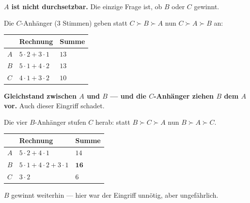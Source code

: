 \begin{aufgabe}
\begin{center}
\begin{minipage}{0.9\textwidth}
\textbf{$A$ ist nicht durchsetzbar.} Die einzige Frage ist, ob $B$ oder $C$ gewinnt.
\end{minipage}
\end{center}


Die $C$-Anhänger ($3$ Stimmen) geben statt $C\succ B\succ A$ nun $C\succ A\succ B$ an:
\begin{center}
{\small
\renewcommand{\arraystretch}{1.48}
\begin{tabular}{@{}P{1.6cm}P{3.2cm}P{1.6cm}@{}}
\toprule
& \textbf{Rechnung} & \textbf{Summe}\\
\midrule
$A$ & $5\cdot2+3\cdot1$ & $13$\\
$B$ & $5\cdot1+4\cdot2$ & $13$\\
$C$ & $4\cdot1+3\cdot2$ & $10$\\
\bottomrule
\end{tabular}}
\end{center}

\begin{center}
\begin{minipage}{0.9\textwidth}
\textbf{Gleichstand zwischen $A$ und $B$ --- und die $C$-Anhänger ziehen $B$ dem $A$ vor.} Auch dieser Eingriff schadet.
\end{minipage}
\end{center}

Die vier $B$-Anhänger stufen $C$ herab: statt $B\succ C\succ A$ nun $B\succ A\succ C$.
\begin{center}
{\small
\renewcommand{\arraystretch}{1.48}
\begin{tabular}{@{}P{1.6cm}P{3.2cm}P{1.6cm}@{}}
\toprule
& \textbf{Rechnung} & \textbf{Summe}\\
\midrule
$A$ & $5\cdot2+4\cdot1$ & $14$\\
$B$ & $5\cdot1+4\cdot2+3\cdot1$ & $\mathbf{16}$\\
$C$ & $3\cdot2$ & $6$\\
\bottomrule
\end{tabular}}
\end{center}

$B$ gewinnt weiterhin --- hier war der Eingriff unnötig, aber ungefährlich.


\end{aufgabe}
